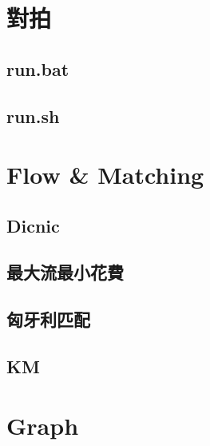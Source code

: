 \section{對拍}

\subsection{run.bat}


\subsection{run.sh}

\section{Flow \& Matching}

\subsection{Dicnic}


\subsection{最大流最小花費}


\subsection{匈牙利匹配}


\subsection{KM}


\section{Graph}

